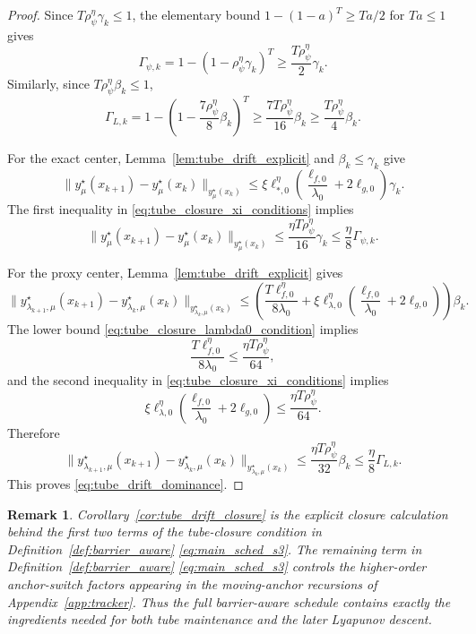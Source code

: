 \documentclass{article}
\newtheorem{remark}{Remark}
\begin{document}
\begin{proof}
Since \(T\rho_\psi^\eta\gamma_k\le1\), the elementary bound
\(1-(1-a)^T\ge Ta/2\) for \(Ta\le1\) gives
\[
\Gamma_{\psi,k}
=
1-(1-\rho_\psi^\eta\gamma_k)^T
\ge
\frac{T\rho_\psi^\eta}{2}\gamma_k .
\]
Similarly, since \(T\rho_\psi^\eta\beta_k\le1\),
\[
\Gamma_{L,k}
=
1-\left(1-\frac{7\rho_\psi^\eta}{8}\beta_k\right)^T
\ge
\frac{7T\rho_\psi^\eta}{16}\beta_k
\ge
\frac{T\rho_\psi^\eta}{4}\beta_k .
\]

For the exact center, Lemma~\ref{lem:tube_drift_explicit} and \(\beta_k\le\gamma_k\) give
\[
\|y_\mu^\star(x_{k+1})-y_\mu^\star(x_k)\|_{y_\mu^\star(x_k)}
\le
\xi\ell_{*,0}^{\eta}
\left(\frac{\ell_{f,0}}{\lambda_0}+2\ell_{g,0}\right)\gamma_k .
\]
The first inequality in \eqref{eq:tube_closure_xi_conditions} implies
\[
\|y_\mu^\star(x_{k+1})-y_\mu^\star(x_k)\|_{y_\mu^\star(x_k)}
\le
\frac{\eta T\rho_\psi^\eta}{16}\gamma_k
\le
\frac{\eta}{8}\Gamma_{\psi,k}.
\]

For the proxy center, Lemma~\ref{lem:tube_drift_explicit} gives
\[
\|y_{\lambda_{k+1},\mu}^\star(x_{k+1})
-y_{\lambda_k,\mu}^\star(x_k)\|_{y_{\lambda_k,\mu}^\star(x_k)}
\le
\left(
\frac{T\ell_{f,0}^{\eta}}{8\lambda_0}
+
\xi\ell_{\lambda,0}^{\eta}
\left(\frac{\ell_{f,0}}{\lambda_0}+2\ell_{g,0}\right)
\right)\beta_k .
\]
The lower bound \eqref{eq:tube_closure_lambda0_condition} implies
\[
\frac{T\ell_{f,0}^{\eta}}{8\lambda_0}
\le
\frac{\eta T\rho_\psi^\eta}{64},
\]
and the second inequality in \eqref{eq:tube_closure_xi_conditions} implies
\[
\xi\ell_{\lambda,0}^{\eta}
\left(\frac{\ell_{f,0}}{\lambda_0}+2\ell_{g,0}\right)
\le
\frac{\eta T\rho_\psi^\eta}{64}.
\]
Therefore
\[
\|y_{\lambda_{k+1},\mu}^\star(x_{k+1})
-y_{\lambda_k,\mu}^\star(x_k)\|_{y_{\lambda_k,\mu}^\star(x_k)}
\le
\frac{\eta T\rho_\psi^\eta}{32}\beta_k
\le
\frac{\eta}{8}\Gamma_{L,k}.
\]
This proves \eqref{eq:tube_drift_dominance}.
\end{proof}


\begin{remark}
Corollary~\ref{cor:tube_drift_closure} is the explicit closure calculation behind the first two terms
of the tube-closure condition in Definition~\ref{def:barrier_aware} \eqref{eq:main_sched_s3}. The remaining term in
Definition~\ref{def:barrier_aware} \eqref{eq:main_sched_s3} controls the higher-order anchor-switch factors appearing in the
moving-anchor recursions of Appendix~\ref{app:tracker}. Thus the full \textit{barrier-aware} schedule
contains exactly the ingredients needed for both tube maintenance and the later Lyapunov descent.
\end{remark}
\end{document}
